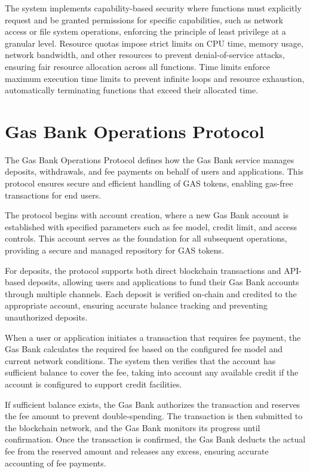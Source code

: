 \documentclass[11pt]{article}
\begin{document}
The system implements capability-based security where functions must explicitly request and be granted permissions for specific capabilities, such as network access or file system operations, enforcing the principle of least privilege at a granular level. Resource quotas impose strict limits on CPU time, memory usage, network bandwidth, and other resources to prevent denial-of-service attacks, ensuring fair resource allocation across all functions. Time limits enforce maximum execution time limits to prevent infinite loops and resource exhaustion, automatically terminating functions that exceed their allocated time.

\section{Gas Bank Operations Protocol}
\label{subsec:gas-bank-protocol-spec}

The Gas Bank Operations Protocol defines how the Gas Bank service manages deposits, withdrawals, and fee payments on behalf of users and applications. This protocol ensures secure and efficient handling of GAS tokens, enabling gas-free transactions for end users.


The protocol begins with account creation, where a new Gas Bank account is established with specified parameters such as fee model, credit limit, and access controls. This account serves as the foundation for all subsequent operations, providing a secure and managed repository for GAS tokens.

For deposits, the protocol supports both direct blockchain transactions and API-based deposits, allowing users and applications to fund their Gas Bank accounts through multiple channels. Each deposit is verified on-chain and credited to the appropriate account, ensuring accurate balance tracking and preventing unauthorized deposits.

When a user or application initiates a transaction that requires fee payment, the Gas Bank calculates the required fee based on the configured fee model and current network conditions. The system then verifies that the account has sufficient balance to cover the fee, taking into account any available credit if the account is configured to support credit facilities.

If sufficient balance exists, the Gas Bank authorizes the transaction and reserves the fee amount to prevent double-spending. The transaction is then submitted to the blockchain network, and the Gas Bank monitors its progress until confirmation. Once the transaction is confirmed, the Gas Bank deducts the actual fee from the reserved amount and releases any excess, ensuring accurate accounting of fee payments.
\end{document}
